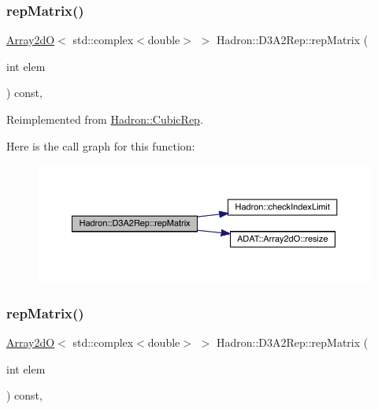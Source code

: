 \subsubsection{\texorpdfstring{repMatrix()}{repMatrix()}\hspace{0.1cm}{\footnotesize\ttfamily [1/3]}}
{\footnotesize\ttfamily \mbox{\hyperlink{classADAT_1_1Array2dO}{Array2dO}}$<$ std\+::complex$<$double$>$ $>$ Hadron\+::\+D3\+A2\+Rep\+::rep\+Matrix (\begin{DoxyParamCaption}\item[{int}]{elem }\end{DoxyParamCaption}) const\hspace{0.3cm}{\ttfamily [inline]}, {\ttfamily [virtual]}}



Reimplemented from \mbox{\hyperlink{structHadron_1_1CubicRep_ac5d7e9e6f4ab1158b5fce3e4ad9e8005}{Hadron\+::\+Cubic\+Rep}}.

Here is the call graph for this function\+:
\nopagebreak
\begin{figure}[H]
\begin{center}
\leavevmode
\includegraphics[width=350pt]{d5/d7f/structHadron_1_1D3A2Rep_a0e868a4c14c9126108a49d429add3c94_cgraph}
\end{center}
\end{figure}
\mbox{\label{structHadron_1_1D3A2Rep_a0e868a4c14c9126108a49d429add3c94}} 
\subsubsection{\texorpdfstring{repMatrix()}{repMatrix()}\hspace{0.1cm}{\footnotesize\ttfamily [2/3]}}
{\footnotesize\ttfamily \mbox{\hyperlink{classADAT_1_1Array2dO}{Array2dO}}$<$ std\+::complex$<$double$>$ $>$ Hadron\+::\+D3\+A2\+Rep\+::rep\+Matrix (\begin{DoxyParamCaption}\item[{int}]{elem }\end{DoxyParamCaption}) const\hspace{0.3cm}{\ttfamily [inline]}, {\ttfamily [virtual]}}



